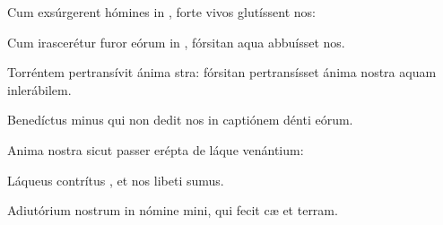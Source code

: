 \item {}

\item Cum exsúrgerent hómines in ,\psstar{} forte vivos glutíssent nos:

\item Cum irascerétur furor eórum in ,\psstar{} fórsitan aqua abbuísset nos.

\item Torréntem pertransívit ánima stra:\psstar{} fórsitan pertransísset ánima nostra aquam inlerábilem.

\item Benedíctus minus\psstar{} qui non dedit nos in captiónem dénti eórum.

\item Anima nostra sicut passer erépta \psstar{} de láque venántium:

\item Láqueus contrítus ,\psstar{} et nos libeti sumus.

\item Adiutórium nostrum in nómine mini,\psstar{} qui fecit cæ et terram.
